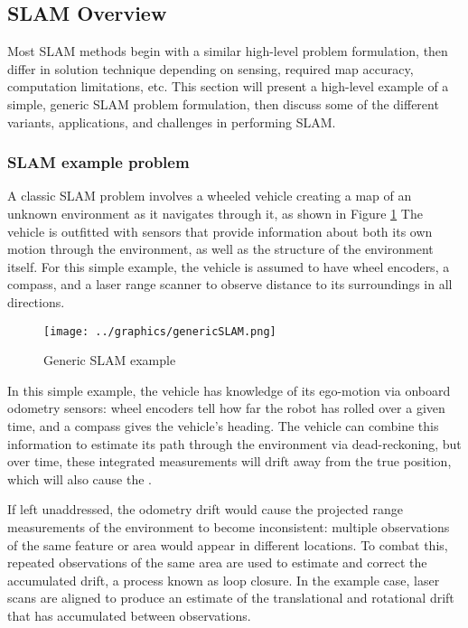 \subsection{SLAM Overview}

Most SLAM methods begin with a similar high-level problem formulation, then differ in solution technique depending on sensing, required map accuracy, computation limitations, etc. This section will present a high-level example of a simple, generic SLAM problem formulation, then discuss some of the different variants, applications, and challenges in performing SLAM. 

\subsubsection{SLAM example problem}
\label{sec:genericSLAM}
A classic SLAM problem involves a wheeled vehicle creating a map of an unknown environment as it navigates through it, as shown in Figure \ref{fig:GenericSLAM} The vehicle is outfitted with sensors that provide information about both its own motion through the environment, as well as the structure of the environment itself. For this simple example, the vehicle is assumed to have wheel encoders, a compass, and a laser range scanner to observe distance to its surroundings in all directions.

 \begin{figure}[!htb]
   \centering
   \texttt{[image: ../graphics/genericSLAM.png]} %
   \caption{ Generic SLAM example}
   \label{fig:GenericSLAM}
\end{figure}


In this simple example, the vehicle has knowledge of its ego-motion via onboard odometry sensors: wheel encoders tell how far the robot has rolled over a given time, and a compass gives the vehicle's heading. The vehicle can combine this information to estimate its path through the environment via dead-reckoning, but over time, these integrated measurements will drift away from the true position, which will also cause the .

If left unaddressed, the odometry drift would cause the projected range measurements of the environment to become inconsistent: multiple observations of the same feature or area would appear in different locations. To combat this, repeated observations of the same area are used to estimate and correct the accumulated drift, a process known as loop closure. In the example case, laser scans are aligned to produce an estimate of the translational and rotational drift that has accumulated between observations. 


